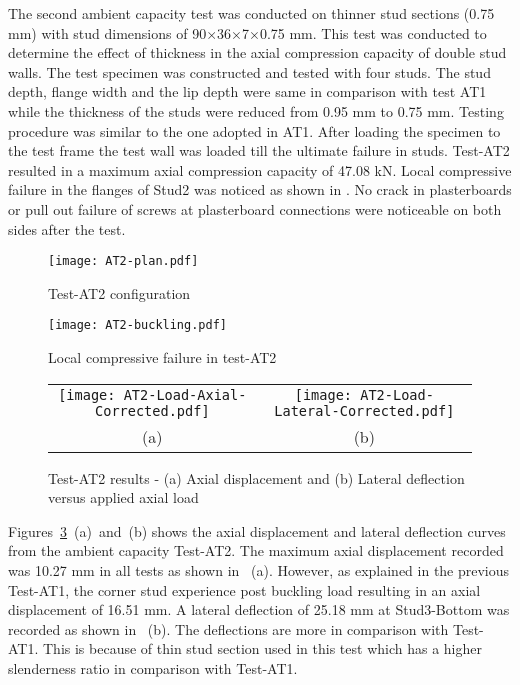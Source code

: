The second ambient capacity test was conducted on thinner stud sections (0.75 mm) with stud dimensions of 90\(\times\)36\(\times\)7\(\times\)0.75 mm. This test was conducted to determine the effect of thickness in the axial compression capacity of double stud walls. The test specimen was constructed and tested with four studs. The stud depth, flange width and the lip depth were same in comparison with test AT1 while the thickness of the studs were reduced from 0.95 mm to 0.75 mm. Testing procedure was similar to the one adopted in AT1. After loading the specimen to the test frame the test wall was loaded till the ultimate failure in studs. Test-AT2 resulted in a maximum axial compression capacity of 47.08 kN. Local compressive failure in the flanges of Stud2 was noticed as shown in . No crack in plasterboards or pull out failure of screws at plasterboard connections were noticeable on both sides after the test.  
\begin{figure}[!htbp]
	\centering
			\texttt{[image: AT2-plan.pdf]}\\
		\caption{Test-AT2 configuration}
		\label{fig:AT2-plan}
\end{figure}  
\begin{figure}[!htbp]
	\centering
			\texttt{[image: AT2-buckling.pdf]}\\
		\caption{Local compressive failure in test-AT2}
		\label{fig:AT2-buckling}
\end{figure}
\begin{figure}
	\centering
		\begin{tabular}{cc}
			\texttt{[image: AT2-Load-Axial-Corrected.pdf]} & \texttt{[image: AT2-Load-Lateral-Corrected.pdf]} \\ 
			(a) & (b)  \\ 
		\end{tabular} 
		\caption{Test-AT2 results - (a) Axial displacement and (b) Lateral deflection versus applied axial load}
		\label{fig:AT2-results}
\end{figure}
Figures~\ref{fig:AT2-results}~(a)~and~(b) shows the axial displacement and lateral deflection curves from the ambient capacity Test-AT2. The maximum axial displacement recorded was 10.27 mm in all tests as shown in ~(a). However, as explained in the previous Test-AT1, the corner stud experience post buckling load resulting in an axial displacement of 16.51 mm. A lateral deflection of 25.18 mm at Stud3-Bottom was recorded as shown in ~(b). The deflections are more in comparison with Test-AT1. This is because of thin stud section used in this test which has a higher slenderness ratio in comparison with Test-AT1.

